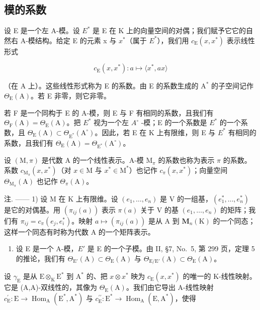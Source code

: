 \subsection{模的系数}

设 E 是一个左 A-模。设 \(E^{*}\) 是 E 在 K 上的向量空间的对偶；我们赋予它它的自然右 A-模结构。给定 E 的元素 x 与 \(x^{*}\)（属于 \(E^{*}\)），我们用 \(c_{\mathrm{E}}(x, x^{*})\) 表示线性形式

\[
c _ {\mathrm{E}} (x, x ^ {*}): a \mapsto \langle x ^ {*}, a x \rangle\tag{5}
\]

（在 A 上）。这些线性形式称为 E 的系数。由 E 的系数生成的 \(\mathrm{A}^*\) 的子空间记作 \(\Theta_{\mathrm{E}}(\mathrm{A})\)。若 E 非零，则它非零。

若 F 是一个同构于 E 的 A-模，则 E 与 F 有相同的系数，且我们有 \(\Theta_{\mathrm{F}}(\mathrm{A}) = \Theta_{\mathrm{E}}(\mathrm{A})\)。把 \(E^{*}\) 视为一个左 \(A^{\circ}\) -模；E 的一个系数是 \(E^{*}\) 的一个系数，且 \(\Theta_{\mathrm{E}}(\mathrm{A}) \subset \Theta_{\mathrm{E}^{*}}(\mathrm{A}^{\circ})\)。因此，若 E 在 K 上有限维，则 E 与 \(E^{*}\) 有相同的系数，且我们有 \(\Theta_{\mathrm{E}}(\mathrm{A}) = \Theta_{\mathrm{E}^{*}}(\mathrm{A}^{\circ})\)。

设 \((\mathrm{M},\pi)\) 是代数 A 的一个线性表示。A-模 \(\mathrm{M}_{\pi}\) 的系数也称为表示 \(\pi\) 的系数。系数 \(c_{\mathrm{M}_{\pi}}(x,x^{*})\)（对 \(x\in \mathrm{M}\) 与 \(x^{*}\in \mathrm{M}^{*}\)）也记作 \(c_{\pi}(x,x^{*})\)；向量空间 \(\Theta_{\mathrm{M}_{\pi}}(\mathrm{A})\) 也记作 \(\Theta_{\pi}(\mathrm{A})\)。

注. —— 1) 设 M 在 K 上有限维。设 \((e_1, \ldots, e_n)\) 是 V 的一组基，\((e_1^*, \ldots, e_n^*)\) 是它的对偶基。用 \((\pi_{ij}(a))\) 表示 \(\pi(a)\) 关于 V 的基 \((e_1, \ldots, e_n)\) 的矩阵；我们有 \(\pi_{ij} = c_\pi(e_j, e_i^*)\)。映射 \(a \mapsto (\pi_{ij}(a))\) 是从 A 到 \(\mathbf{M}_n(\mathrm{K})\) 的一个同态；这样一个同态有时称为代数 A 的一个矩阵表示。

\begin{enumerate}
\def\labelenumi{\arabic{enumi})}
\setcounter{enumi}{1}
\tightlist
\item
  设 E 是一个 A-模，\(E'\) 是 E 的一个子模。由 II, §7, No.~5, 第 299 页，定理 5 的推论，我们有 \(\Theta_{\mathrm{E}'}(\mathrm{A}) \subset \Theta_{\mathrm{E}}(\mathrm{A})\) 与 \(\Theta_{\mathrm{E}/\mathrm{E}'}(\mathrm{A}) \subset \Theta_{\mathrm{E}}(\mathrm{A})\)。
\end{enumerate}

设 \(\gamma_{\mathrm{E}}\) 是从 \(\mathrm{E} \otimes_{\mathrm{K}} \mathrm{E}^{*}\) 到 \(\mathrm{A}^{*}\) 的、把 \(x \otimes x^{*}\) 映为 \(c_{\mathrm{E}}(x, x^{*})\) 的唯一的 K-线性映射。它是 (A,A)-双线性的，其像为 \(\Theta_{\mathrm{E}}(\mathrm{A})\)。我们由它导出 A-线性映射 \(c_{\mathrm{E}}^{\prime}: \mathrm{E} \to \operatorname{Hom}_{\mathrm{A}}(\mathrm{E}^{*}, \mathrm{A}^{*})\) 与 \(c_{\mathrm{E}}^{\prime \prime}: \mathrm{E}^{*} \to \operatorname{Hom}_{\mathrm{A}}(\mathrm{E}, \mathrm{A}^{*})\)，使得

